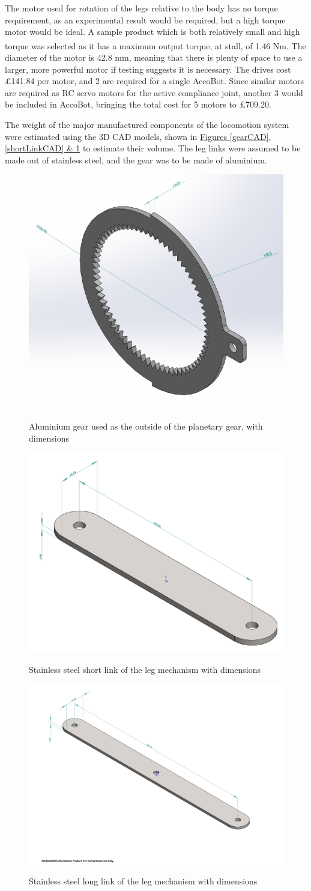 \documentclass[11pt]{article}		%
\newcommand{\supercite}[1]{\textsuperscript{\cite{#1}}}		%
\begin{document}
				The motor used for rotation of the legs relative to the body has no torque requirement, as an experimental result would be required, but a high torque motor would be ideal.
				A sample product which is both relatively small and high torque was selected\supercite{rsproRotation} as it has a maximum output torque, at stall, of 1.46 Nm.
				The diameter of the motor is 42.8 mm, meaning that there is plenty of space to use a larger, more powerful motor if testing suggests it is necessary.
				The drives cost £141.84 per motor, and 2 are required for a single AccoBot.
				Since similar motors are required as RC servo motors for the active compliance joint, another 3 would be included in AccoBot, bringing the total cost for 5 motors to £709.20.
				
				The weight of the major manufactured components of the locomotion system were estimated using the 3D CAD models, shown in \hyperref[gearCAD]{Figures \ref*{gearCAD}, \ref*{shortLinkCAD} \& \ref*{longLinkCAD}} to estimate their volume.
				The leg links were assumed to be made out of stainless steel, and the gear was to be made of aluminium.
							
				\begin{figure}[h]
					\centering
					\begin{multicols}{3}
						\includegraphics[height=0.21\textwidth]{gearCAD}
						\caption{Aluminium gear used as the outside of the planetary gear, with dimensions}
						\label{gearCAD}
						\columnbreak
						\includegraphics[height=0.21\textwidth]{shortLinkCAD}
						\caption{Stainless steel short link of the leg mechanism with dimensions}
						\label{shortLinkCAD}
						\columnbreak
						\includegraphics[height=0.21\textwidth]{longLinkCAD}
						\caption{Stainless steel long link of the leg mechanism with dimensions}
						\label{longLinkCAD}
					\end{multicols}
				\end{figure}
				
\end{document}
